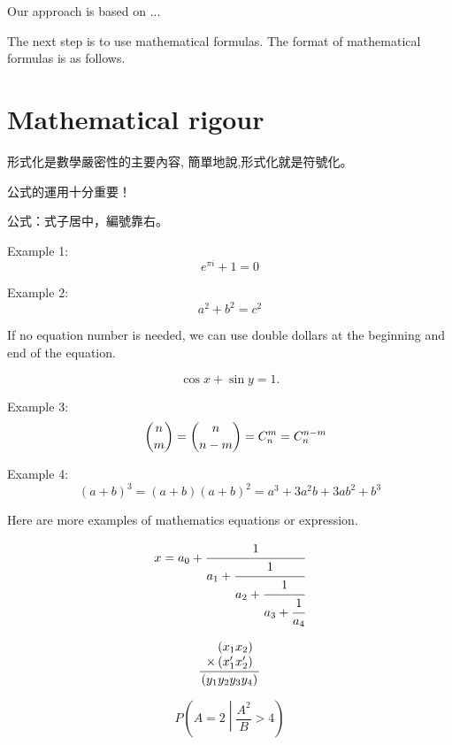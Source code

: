 Our approach is based on ...

The next step is to use mathematical formulas. The format of mathematical formulas is as follows.

\section{Mathematical rigour}

形式化是數學嚴密性的主要內容, 簡單地說,形式化就是符號化。

公式的運用十分重要！

公式：式子居中，編號靠右。

Example 1:
\begin{equation}
\label{eq1}
	e^{\pi i}+1=0
\end{equation}

Example 2:
\begin{equation}
\label{eq2}
	a^2+b^2=c^2
\end{equation}

If no equation number is needed, we can use double dollars at the beginning and end of the equation.

$$
\cos{x}+\sin{y}=1.
$$

Example 3:
\begin{equation}
\label{eq3}
\quad\dbinom{n}{m}=\dbinom{n}{n-m}=C_n^m=C_n^{n-m}
\end{equation}

Example 4:
\begin{equation}
    (a + b)^3 = (a + b) (a + b)^2=a^3 + 3a^2b + 3ab^2 + b^3     
\end{equation}

Here are more examples of mathematics equations or expression.


\begin{equation}
  x = a_0 + \cfrac{1}{a_1 
          + \cfrac{1}{a_2 
          + \cfrac{1}{a_3 + \cfrac{1}{a_4} } } }
\end{equation}




\begin{equation*}
\frac{
    \begin{array}[b]{r}
      \left( x_1 x_2 \right)\\
      \times \left( x'_1 x'_2 \right)
    \end{array}
  }{
    \left( y_1y_2y_3y_4 \right)
  }
\end{equation*}


\[
P\left(A=2\middle|\frac{A^2}{B}>4\right)
\]


